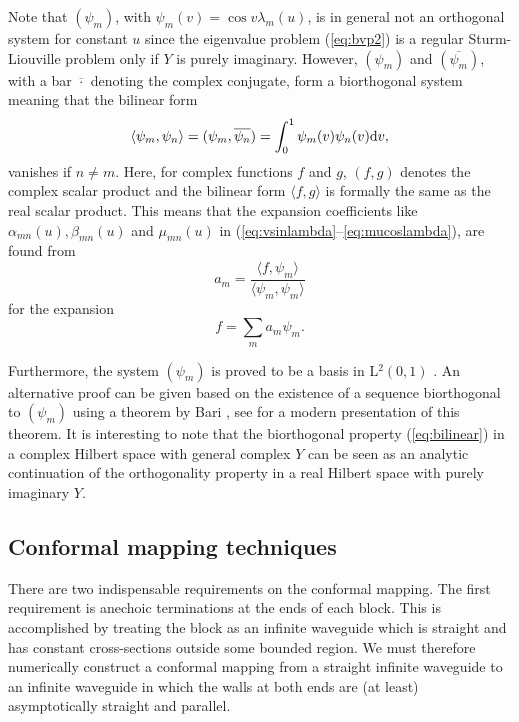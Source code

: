 \documentclass{svjour3}
\begin{document}
Note that $(\psi_m)$, with $\psi_m(v)=\cos v\lambda_m(u)$, is in
general not an orthogonal system for constant $u$ since the eigenvalue
problem (\ref{eq:bvp2}) is a regular Sturm-Liouville problem only if
$Y$ is purely imaginary. However, $(\psi_m)$ and
$(\overline{\psi_m})$, with a bar $\overline{\cdot}$ denoting the
complex conjugate, form a biorthogonal system meaning that the
bilinear form
\begin{equation}\label{eq:bilinear}
  \langle \psi_m,\psi_n\rangle
  =(\psi_m,\overline{\psi_n})
  =\int_0^1\psi_m(v)\psi_n(v){\rm d}v,
\end{equation}
vanishes if $n\neq m$. Here, for complex functions $f$ and $g$,
$(f,g)$ denotes the complex scalar product and the bilinear form
$\langle f,g \rangle$ is formally the same as the real scalar
product. This means that the expansion coefficients like
$\alpha_{mn}(u),\beta_{mn}(u)$ and $\mu_{mn}(u)$ in
(\ref{eq:vsinlambda}--\ref{eq:mucoslambda}), are found from
\begin{equation}\label{eq:am}
  a_m=\frac{\langle f,\psi_m \rangle}
  {\langle \psi_m,\psi_m \rangle}
\end{equation}
for the expansion
\begin{equation}\label{eq:expansion}
  f=\sum_m a_m \psi_m.
\end{equation}

Furthermore, the system $(\psi_m)$ is proved to be a basis in
L$^2(0,1)$ \cite{Schwartz:1954}. An alternative proof can be given
based on the existence of a sequence biorthogonal to $(\psi_m)$
using a theorem by Bari \cite{Bari:1944}, see \cite{Christensson:2003}
for a modern presentation of this theorem. It is interesting to note
that the biorthogonal property (\ref{eq:bilinear}) in a complex
Hilbert space with general complex $Y$ can be seen as an analytic
continuation of the orthogonality property in a real Hilbert space
with purely imaginary $Y$.

\subsection{Conformal mapping techniques}
\label{sec:confmap}

There are two indispensable requirements on the conformal mapping. The
first requirement is anechoic terminations at the ends of each
block. This is accomplished by treating the block as an infinite
waveguide which is straight and has constant cross-sections outside
some bounded region. We must therefore numerically construct a
conformal mapping from a straight infinite waveguide to an infinite
waveguide in which the walls at both ends are (at least)
asymptotically straight and parallel.
\end{document}
